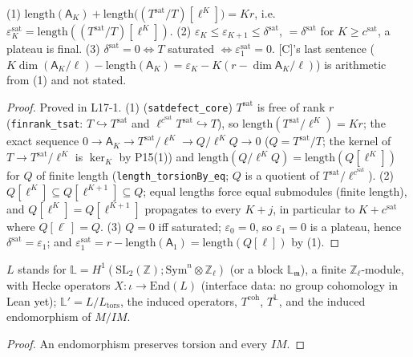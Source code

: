 \begin{proposition}\label{prop:satdefect}
  \leanok
  (1) $\mathrm{length}(\mathsf A_K)+\mathrm{length}\bigl((T^{\mathrm{sat}}/T)[\ell^K]\bigr)=Kr$, i.e.\ $\varepsilon^{\mathrm{sat}}_K=\mathrm{length}((T^{\mathrm{sat}}/T)[\ell^K])$.
  (2) $\varepsilon_K\le\varepsilon_{K+1}\le\delta^{\mathrm{sat}}$, $=\delta^{\mathrm{sat}}$ for $K\ge c^{\mathrm{sat}}$, a plateau is final.
  (3) $\delta^{\mathrm{sat}}=0\iff T$ saturated $\iff\varepsilon^{\mathrm{sat}}_1=0$. [C]'s last sentence
  ($K\dim(\mathsf A_K/\ell)-\mathrm{length}(\mathsf A_K)=\varepsilon_K-K(r-\dim\mathsf A_K/\ell)$) is arithmetic from (1) and not stated.
\end{proposition}
\begin{proof}
  \leanok
  Proved in L17-1. (1) (\texttt{satdefect\_core}) $T^{\mathrm{sat}}$ is free of rank $r$ (\texttt{finrank\_tsat}: $T\hookrightarrow
  T^{\mathrm{sat}}$ and $\ell^{c^{\mathrm{sat}}}T^{\mathrm{sat}}\hookrightarrow T$), so $\mathrm{length}(T^{\mathrm{sat}}/\ell^K)=Kr$; the
  exact sequence $0\to\mathsf A_K\to T^{\mathrm{sat}}/\ell^K\to Q/\ell^KQ\to0$ ($Q=T^{\mathrm{sat}}/T$; the kernel of
  $T\to T^{\mathrm{sat}}/\ell^K$ is $\ker_K$ by P15(1)) and $\mathrm{length}(Q/\ell^KQ)=\mathrm{length}(Q[\ell^K])$ for $Q$ of finite
  length (\texttt{length\_torsionBy\_eq}; $Q$ is a quotient of $T^{\mathrm{sat}}/\ell^{c^{\mathrm{sat}}}$). (2) $Q[\ell^K]\subseteq
  Q[\ell^{K+1}]\subseteq Q$; equal lengths force equal submodules (finite length), and $Q[\ell^K]=Q[\ell^{K+1}]$ propagates to every
  $K+j$, in particular to $K+c^{\mathrm{sat}}$ where $Q[\ell^{\cdot}]=Q$. (3) $Q=0$ iff saturated; $\varepsilon_0=0$, so
  $\varepsilon_1=0$ is a plateau, hence $\delta^{\mathrm{sat}}=\varepsilon_1$; and $\varepsilon^{\mathrm{sat}}_1=r-\mathrm{length}(\mathsf A_1)=
  \mathrm{length}(Q[\ell])$ by (1).
\end{proof}

\begin{definition}\label{inf:satlevelone}
  \leanok
  $L$ stands for $\mathbb L=H^1(\mathrm{SL}_2(\mathbb Z);\mathrm{Sym}^n\otimes\mathbb Z_\ell)$ (or a block $\mathbb L_{\mathfrak m}$), a finite
  $\mathbb Z_\ell$-module, with Hecke operators $X\colon\iota\to\mathrm{End}(L)$ (interface data: no group cohomology in Lean yet);
  $\mathbb L'=L/L_{\mathrm{tors}}$, the induced operators, $T^{\mathrm{coh}}$, $T^{\mathbb L}$, and the induced endomorphism of $M/IM$.
\end{definition}
\begin{proof}
  \leanok
  An endomorphism preserves torsion and every $IM$.
\end{proof}

